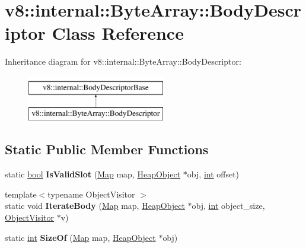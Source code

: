 \hypertarget{classv8_1_1internal_1_1ByteArray_1_1BodyDescriptor}{}\section{v8\+:\+:internal\+:\+:Byte\+Array\+:\+:Body\+Descriptor Class Reference}
\label{classv8_1_1internal_1_1ByteArray_1_1BodyDescriptor}
Inheritance diagram for v8\+:\+:internal\+:\+:Byte\+Array\+:\+:Body\+Descriptor\+:\begin{figure}[H]
\begin{center}
\leavevmode
\includegraphics[height=2.000000cm]{classv8_1_1internal_1_1ByteArray_1_1BodyDescriptor}
\end{center}
\end{figure}
\subsection*{Static Public Member Functions}
\begin{DoxyCompactItemize}
\item 
\mbox{\label{classv8_1_1internal_1_1ByteArray_1_1BodyDescriptor_a3e266b6c2b4a0d733993503a18e491bd}} 
static \mbox{\hyperlink{classbool}{bool}} {\bfseries Is\+Valid\+Slot} (\mbox{\hyperlink{classv8_1_1internal_1_1Map}{Map}} map, \mbox{\hyperlink{classv8_1_1internal_1_1HeapObject}{Heap\+Object}} $\ast$obj, \mbox{\hyperlink{classint}{int}} offset)
\item 
\mbox{\label{classv8_1_1internal_1_1ByteArray_1_1BodyDescriptor_ad5cfd90408b7c8b032fae4fd6000398c}} 
{\footnotesize template$<$typename Object\+Visitor $>$ }\\static void {\bfseries Iterate\+Body} (\mbox{\hyperlink{classv8_1_1internal_1_1Map}{Map}} map, \mbox{\hyperlink{classv8_1_1internal_1_1HeapObject}{Heap\+Object}} $\ast$obj, \mbox{\hyperlink{classint}{int}} object\+\_\+size, \mbox{\hyperlink{classv8_1_1internal_1_1ObjectVisitor}{Object\+Visitor}} $\ast$v)
\item 
\mbox{\label{classv8_1_1internal_1_1ByteArray_1_1BodyDescriptor_ac27f2b6d75c9bc826914b0b48a488717}} 
static \mbox{\hyperlink{classint}{int}} {\bfseries Size\+Of} (\mbox{\hyperlink{classv8_1_1internal_1_1Map}{Map}} map, \mbox{\hyperlink{classv8_1_1internal_1_1HeapObject}{Heap\+Object}} $\ast$obj)
\end{DoxyCompactItemize}
